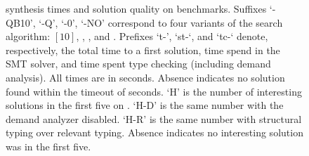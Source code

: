 \documentclass[acmsmall]{acmart}
\begin{document}
\newcommand{\interestingCount}{32\xspace}


\begin{figure}
    \resizebox{\textwidth}{!}{
    
    }

  \caption{\tool synthesis times and solution quality on \benchmarkCount benchmarks.
  Suffixes `-QB10', `-Q', `-0', `-NO'
  correspond to four variants of the search algorithm:
  \mQryTypeBounded$[10]$, \mQryType, \mTopType, and \mNoGar.
  Prefixes `t-', `st-`, and `tc-` denote, respectively,
  the total time to a first solution,
  time spend in the SMT solver,
  and time spent type checking (including demand analysis).
  All times are in seconds.
  Absence indicates no solution found within the timeout of \timeout seconds.
  `H' is the number of interesting solutions in the first five on \tool.
  `H-D' is the same number with the demand analyzer disabled.
  `H-R' is the same number with structural typing over relevant typing.
  Absence indicates no interesting solution was in the first five.
  }

\end{figure}
\end{document}
